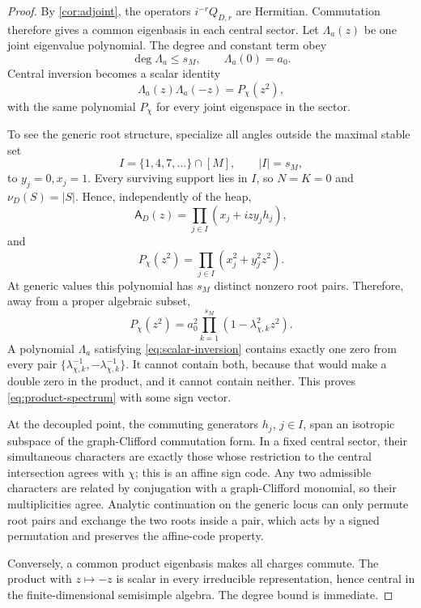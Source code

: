 \documentclass[10pt,letterpaper]{article}
\newcommand{\cA}{\mathsf A}
\begin{document}
\begin{proof}
By \cref{cor:adjoint}, the operators \(i^{-r}Q_{D,r}\) are Hermitian.  Commutation therefore gives a common eigenbasis in each central sector.  Let \(\Lambda_a(z)\) be one joint eigenvalue polynomial.  The degree and constant term obey
\[
 \deg\Lambda_a\le s_M,
 \qquad \Lambda_a(0)=a_0.
\]
Central inversion becomes a scalar identity
\begin{equation}\label{eq:scalar-inversion}
 \Lambda_a(z)\Lambda_a(-z)=P_\chi(z^2),
\end{equation}
with the same polynomial \(P_\chi\) for every joint eigenspace in the sector.

To see the generic root structure, specialize all angles outside the maximal stable set
\[
 I=\{1,4,7,\ldots\}\cap[M],
 \qquad |I|=s_M,
\]
to \(y_j=0,x_j=1\).  Every surviving support lies in \(I\), so \(N=K=0\) and \(\nu_D(S)=|S|\).  Hence, independently of the heap,
\begin{equation}\label{eq:decoupled-A}
 \cA_D(z)=\prod_{j\in I}(x_j+i z y_jh_j),
\end{equation}
and
\[
 P_\chi(z^2)=\prod_{j\in I}(x_j^2+y_j^2z^2).
\]
At generic values this polynomial has \(s_M\) distinct nonzero root pairs.  Therefore, away from a proper algebraic subset,
\begin{equation}\label{eq:P-factor}
 P_\chi(z^2)=a_0^2\prod_{k=1}^{s_M}(1-\lambda_{\chi,k}^2z^2).
\end{equation}
A polynomial \(\Lambda_a\) satisfying \eqref{eq:scalar-inversion} contains exactly one zero from every pair \(\{\lambda_{\chi,k}^{-1},-\lambda_{\chi,k}^{-1}\}\).  It cannot contain both, because that would make a double zero in the product, and it cannot contain neither.  This proves \eqref{eq:product-spectrum} with some sign vector.

At the decoupled point, the commuting generators \(h_j\), \(j\in I\), span an isotropic subspace of the graph-Clifford commutation form.  In a fixed central sector, their simultaneous characters are exactly those whose restriction to the central intersection agrees with \(\chi\); this is an affine sign code.  Any two admissible characters are related by conjugation with a graph-Clifford monomial, so their multiplicities agree.  Analytic continuation on the generic locus can only permute root pairs and exchange the two roots inside a pair, which acts by a signed permutation and preserves the affine-code property.

Conversely, a common product eigenbasis makes all charges commute.  The product with \(z\mapsto-z\) is scalar in every irreducible representation, hence central in the finite-dimensional semisimple algebra.  The degree bound is immediate.
\end{proof}
\end{document}
